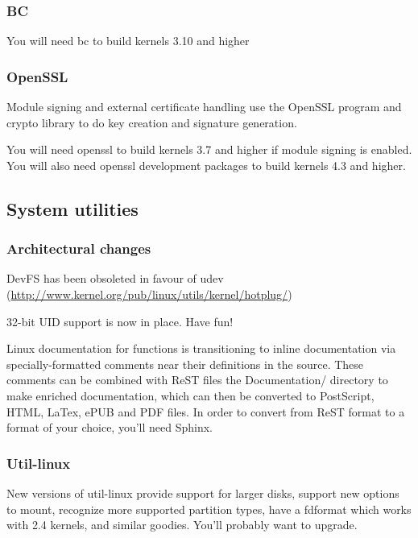 \documentclass[a4paper,8pt,english]{sphinxmanual}
\begin{document}
\subsubsection{BC}
\label{process/changes:bc}
You will need bc to build kernels 3.10 and higher


\subsubsection{OpenSSL}
\label{process/changes:openssl}
Module signing and external certificate handling use the OpenSSL program and
crypto library to do key creation and signature generation.

You will need openssl to build kernels 3.7 and higher if module signing is
enabled.  You will also need openssl development packages to build kernels 4.3
and higher.


\subsection{System utilities}
\label{process/changes:system-utilities}

\subsubsection{Architectural changes}
\label{process/changes:architectural-changes}
DevFS has been obsoleted in favour of udev
(\href{http://www.kernel.org/pub/linux/utils/kernel/hotplug/}{http://www.kernel.org/pub/linux/utils/kernel/hotplug/})

32-bit UID support is now in place.  Have fun!

Linux documentation for functions is transitioning to inline
documentation via specially-formatted comments near their
definitions in the source.  These comments can be combined with ReST
files the Documentation/ directory to make enriched documentation, which can
then be converted to PostScript, HTML, LaTex, ePUB and PDF files.
In order to convert from ReST format to a format of your choice, you'll need
Sphinx.


\subsubsection{Util-linux}
\label{process/changes:util-linux}
New versions of util-linux provide  support for larger disks,
support new options to mount, recognize more supported partition
types, have a fdformat which works with 2.4 kernels, and similar goodies.
You'll probably want to upgrade.
\end{document}
